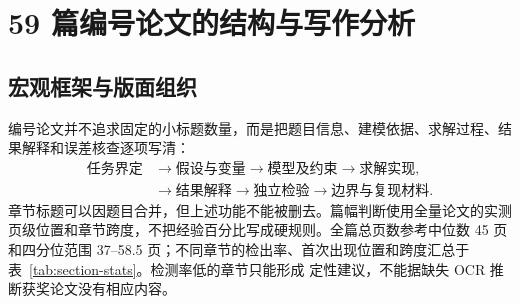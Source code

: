 \documentclass[UTF8,a4paper,12pt]{ctexart}
\begin{document}
\section{59 篇编号论文的结构与写作分析}

\subsection{宏观框架与版面组织}

编号论文并不追求固定的小标题数量，而是把题目信息、建模依据、求解过程、结果解释和误差核查逐项写清：
\[
\begin{aligned}
\text{任务界定}&\longrightarrow\text{假设与变量}
\longrightarrow\text{模型及约束}\longrightarrow\text{求解实现},\\
&\longrightarrow\text{结果解释}
\longrightarrow\text{独立检验}\longrightarrow\text{边界与复现材料}.
\end{aligned}
\]
章节标题可以因题目合并，但上述功能不能被删去。篇幅判断使用全量论文的实测
页级位置和章节跨度，不把经验百分比写成硬规则。全篇总页数参考中位数
45 页和四分位范围 37--58.5 页；不同章节的检出率、首次出现位置和跨度汇总于
表~\ref{tab:section-stats}。检测率低的章节只能形成
定性建议，不能据缺失 OCR 推断获奖论文没有相应内容。
\end{document}
